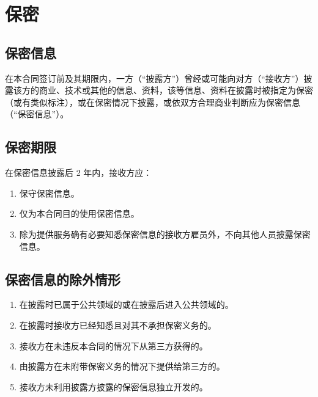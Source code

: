 \section{保密}

\subsection{保密信息}
在本合同签订前及其期限内，一方（“披露方”）曾经或可能向对方（“接收方”）披露该方的商业、技术或其他的信息、资料，该等信息、资料在披露时被指定为保密（或有类似标注），或在保密情况下披露，或依双方合理商业判断应为保密信息（“保密信息”）。

\subsection{保密期限}
在保密信息披露后 2 年内，接收方应：
\begin{enumerate}
  \item 保守保密信息。
  \item 仅为本合同目的使用保密信息。
  \item 除为提供服务确有必要知悉保密信息的接收方雇员外，不向其他人员披露保密信息。
\end{enumerate}

\subsection{保密信息的除外情形}
\begin{enumerate} 
  \item 在披露时已属于公共领域的或在披露后进入公共领域的。
  \item 在披露时接收方已经知悉且对其不承担保密义务的。
  \item 接收方在未违反本合同的情况下从第三方获得的。
  \item 由披露方在未附带保密义务的情况下提供给第三方的。
  \item 接收方未利用披露方披露的保密信息独立开发的。
\end{enumerate}
